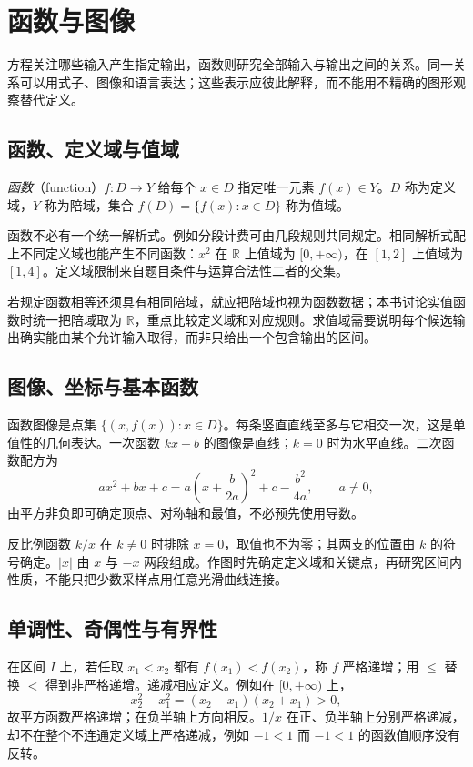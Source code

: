 \setcounter{chapter}{6} %
\chapter{函数与图像}
\label{chap:em-functions}
方程关注哪些输入产生指定输出，函数则研究全部输入与输出之间的关系。同一关系可以用式子、图像和语言表达；这些表示应彼此解释，而不能用不精确的图形观察替代定义。

\section{函数、定义域与值域}
\begin{definition}
\emph{函数}（function）$f:D\to Y$ 给每个 $x\in D$ 指定唯一元素 $f(x)\in Y$。$D$ 称为定义域，$Y$ 称为陪域，集合 $f(D)=\{f(x):x\in D\}$ 称为值域。
\end{definition}
函数不必有一个统一解析式。例如分段计费可由几段规则共同规定。相同解析式配上不同定义域也能产生不同函数：$x^2$ 在 $\mathbb R$ 上值域为 $[0,+\infty)$，在 $[1,2]$ 上值域为 $[1,4]$。定义域限制来自题目条件与运算合法性二者的交集。

若规定函数相等还须具有相同陪域，就应把陪域也视为函数数据；本书讨论实值函数时统一把陪域取为 $\mathbb R$，重点比较定义域和对应规则。求值域需要说明每个候选输出确实能由某个允许输入取得，而非只给出一个包含输出的区间。

\section{图像、坐标与基本函数}
函数图像是点集 $\{(x,f(x)):x\in D\}$。每条竖直直线至多与它相交一次，这是单值性的几何表达。一次函数 $kx+b$ 的图像是直线；$k=0$ 时为水平直线。二次函数配方为
\[
 ax^2+bx+c=a\left(x+\frac b{2a}\right)^2+c-\frac{b^2}{4a},\qquad a\ne0,
\]
由平方非负即可确定顶点、对称轴和最值，不必预先使用导数。

反比例函数 $k/x$ 在 $k\ne0$ 时排除 $x=0$，取值也不为零；其两支的位置由 $k$ 的符号确定。$|x|$ 由 $x$ 与 $-x$ 两段组成。作图时先确定定义域和关键点，再研究区间内性质，不能只把少数采样点用任意光滑曲线连接。

\section{单调性、奇偶性与有界性}
在区间 $I$ 上，若任取 $x_1<x_2$ 都有 $f(x_1)<f(x_2)$，称 $f$ 严格递增；用 $\le$ 替换 $<$ 得到非严格递增。递减相应定义。例如在 $[0,+\infty)$ 上，
\[
 x_2^2-x_1^2=(x_2-x_1)(x_2+x_1)>0,
\]
故平方函数严格递增；在负半轴上方向相反。$1/x$ 在正、负半轴上分别严格递减，却不在整个不连通定义域上严格递减，例如 $-1<1$ 而 $-1<1$ 的函数值顺序没有反转。

